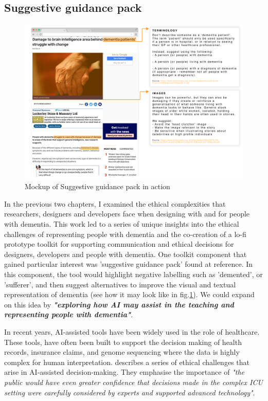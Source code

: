 \subsection{Suggestive guidance pack}
\label{FutureStudyThree}
\begin{figure}[htp]
\centering
\includegraphics[width=1\linewidth]{Images/Discussion/Aware-AI.png}
\caption{Mockup of Suggestive guidance pack
 in action}
\label{fig:AwareAI}
\end{figure}
In the previous two chapters, I examined the ethical complexities that researchers, designers and developers face when designing with and for people with dementia. This work led to a series of unique insights into the ethical challenges of representing people with dementia and the co-creation of a lo-fi prototype toolkit for supporting communication and ethical decisions for designers, developers and people with dementia. One toolkit component that gained particular interest was 'suggestive guidance pack' found at reference. In this component, the tool would highlight negative labelling such as 'demented', or 'sufferer', and then suggest alternatives to improve the visual and textual representation of dementia (see how it may look like in fig.\ref{fig:AwareAI}). We could expand on this idea by \textit{\textbf{"exploring how AI may assist in the teaching and representing people with dementia"}}.

In recent years, AI-assisted tools have been widely used in the role of healthcare. These tools, have often been built to support the decision making of health records, insurance claims, and genome sequencing where the data is highly complex for human interpretation. \cite{lysaght2019ai} describes a series of ethical challenges that arise in AI-assisted decision-making. They emphasise the importance of \textit{"the public would have even greater confidence that decisions made in the complex ICU setting were carefully considered by experts and supported advanced technology"}. 

